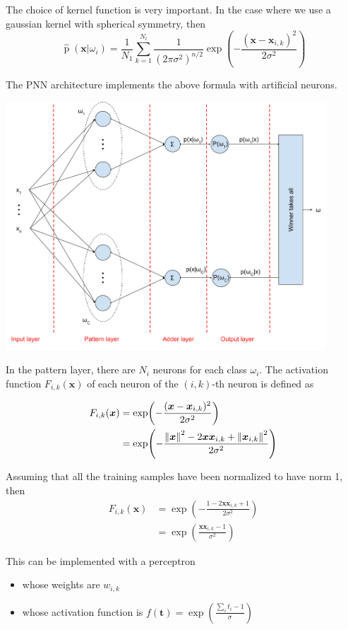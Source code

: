 \documentclass[oneside,onecolumn]{report}
\DeclareMathOperator*{\pdf}{p}
\begin{document}
The choice of kernel function is very important.
In the case where we use a gaussian kernel with spherical symmetry, then
$$ \widehat{\pdf}(\bm x | \omega_i) = \frac{1}{N_1} \sum_{k = 1}^{N_i} \frac{1}{(2 \pi \sigma^2)^{n/2}} \exp(-\frac{(\bm x - \bm x_{i,k})^2}{2 \sigma^2}) $$

The PNN architecture implements the above formula with artificial neurons.
\begin{center}
    \includegraphics[width=12cm]{probabilistic_neural_network.png}
\end{center}

In the pattern layer, there are $N_i$ neurons for each class $\omega_i$.
The activation function $F_{i,k}(\bm x)$ of each neuron of the $(i, k)$-th neuron is defined as

\begin{align*}
    F_{i,k}(\bm x)
    &= \exp(-\frac{(\bm x - \bm x_{i,k})^2}{2 \sigma^2}) \\
    &= \exp(-\frac{\norm{\bm x}^2 - 2 \bm x \bm x_{i,k} + \norm{\bm x_{i,k}}^2}{2 \sigma^2})
\end{align*}

Assuming that all the training samples have been normalized to have norm 1, then
\begin{align*}
F_{i,k}(\bm x)
    &= \exp(-\frac{1 - 2 \bm x \bm x_{i,k} + 1}{2 \sigma^2}) \\
    &= \exp(\frac{\bm x \bm x_{i,k} - 1}{ \sigma^2})
\end{align*}

This can be implemented with a perceptron
\begin{itemize}
    \item whose weights are $w_{i,k}$
    \item whose activation function is $f(\bm t) = \exp(\frac{\sum_i t_i - 1}{\sigma})$
\end{itemize}
\end{document}
